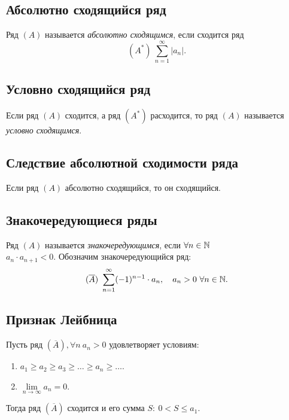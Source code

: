 \subsection{Абсолютно сходящийся ряд}

\begin{definition}
    Ряд $(A)$ называется \emph{абсолютно сходящимся}, если сходится ряд
    \[
        (A^*) \ \sum_{n=1}^{\infty}|a_n|.
    \]
\end{definition}

\subsection{Условно сходящийся ряд}

\begin{definition}
    Если ряд $(A)$ сходится, а ряд $(A^*)$ расходится, то ряд $(A)$ называется \emph{условно сходящимся}.
\end{definition}

\subsection{Следствие абсолютной сходимости ряда}

\begin{statement}
    Если ряд $(A)$ абсолютно сходящийся, то он сходящийся.
\end{statement}

\newpage

\subsection{Знакочередующиеся ряды}

\begin{definition}
    Ряд $(A)$ называется \emph{знакочередующимся}, если $\forall n \in \mathbb{N} $ \\ $ a_n \cdot a_{n+1} < 0$. Обозначим знакочередующийся ряд:
    \[
        (\overline{A}) \ \sum_{n=1}^{\infty}(-1)^{n-1}\cdot a_n, \quad a_n > 0 \ \forall n \in\N.
    \]
\end{definition}

\subsection{Признак Лейбница}

\begin{theorem}
    Пусть ряд $(\overline{A}), \forall n \ a_n > 0 $ удовлетворяет условиям:
    \begin{enumerate}
        \item $a_1 \geqslant a_2 \geqslant a_3 \geqslant \ldots \geqslant a_n \geqslant \ldots$.
        \item $\underset{n\rightarrow\infty}{\lim} a_n = 0$.
    \end{enumerate}

    Тогда ряд $(\overline{A})$ сходится и его сумма $S: \ 0 < S \leqslant a_1$.
\end{theorem}

